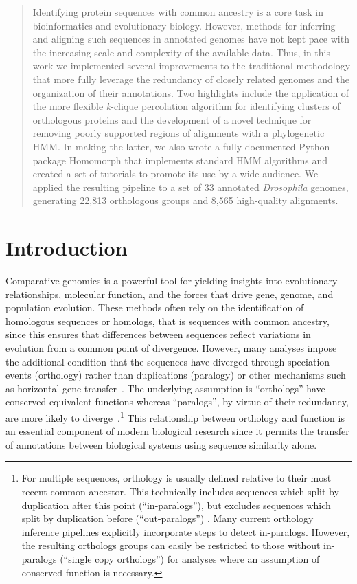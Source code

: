 \begin{abstract}
\noindent
Identifying protein sequences with common ancestry is a core task in bioinformatics and evolutionary biology. However, methods for inferring and aligning such sequences in annotated genomes have not kept pace with the increasing scale and complexity of the available data. Thus, in this work we implemented several improvements to the traditional methodology that more fully leverage the redundancy of closely related genomes and the organization of their annotations. Two highlights include the application of the more flexible \textit{k}-clique percolation algorithm for identifying clusters of orthologous proteins and the development of a novel technique for removing poorly supported regions of alignments with a phylogenetic HMM. In making the latter, we also wrote a fully documented Python package Homomorph that implements standard HMM algorithms and created a set of tutorials to promote its use by a wide audience. We applied the resulting pipeline to a set of 33 annotated \textit{Drosophila} genomes, generating 22,813 orthologous groups and 8,565 high-quality alignments.
\end{abstract}

\section*{Introduction}
Comparative genomics is a powerful tool for yielding insights into evolutionary relationships, molecular function, and the forces that drive gene, genome, and population evolution. These methods often rely on the identification of homologous sequences or homologs, that is sequences with common ancestry, since this ensures that differences between sequences reflect variations in evolution from a common point of divergence. However, many analyses impose the additional condition that the sequences have diverged through speciation events (orthology) rather than duplications (paralogy) or other mechanisms such as horizontal gene transfer~\cite{Fitch1970}. The underlying assumption is ``orthologs'' have conserved equivalent functions whereas ``paralogs'', by virtue of their redundancy, are more likely to diverge~\cite{Ohno1970, Nowak1997, Altenhoff2012, Pegueroles2013, Soria2014}.\footnote{For multiple sequences, orthology is usually defined relative to their most recent common ancestor. This technically includes sequences which split by duplication after this point (``in-paralogs''), but excludes sequences which split by duplication before (``out-paralogs'') \cite{Remm2001}. Many current orthology inference pipelines explicitly incorporate steps to detect in-paralogs. However, the resulting orthologs groups can easily be restricted to those without in-paralogs (``single copy orthologs'') for analyses where an assumption of conserved function is necessary.} This relationship between orthology and function is an essential component of modern biological research since it permits the transfer of annotations between biological systems using sequence similarity alone.

